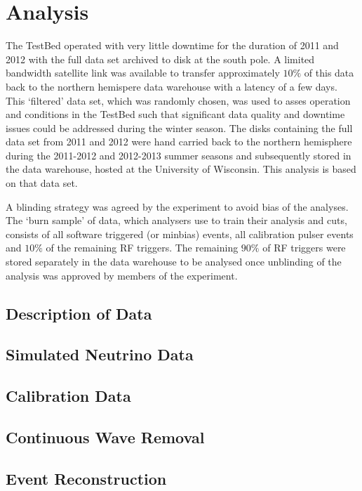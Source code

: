 \chapter{Analysis}
\label{chap:Analysis}


The TestBed operated with very little downtime for the duration of 2011 and 2012 with the full data set archived to disk at the south pole. A limited bandwidth satellite link was available to transfer approximately $10 \%$ of this data back to the northern hemispere data warehouse with a latency of a few days. This `filtered' data set, which was randomly chosen, was used to asses operation and conditions in the TestBed such that significant data quality and downtime issues could be addressed during the winter season. The disks containing the full data set from 2011 and 2012 were hand carried back to the northern hemisphere during the 2011-2012 and 2012-2013 summer seasons and subsequently stored in the data warehouse, hosted at the University of Wisconsin. This analysis is based on that data set.

A blinding strategy was agreed by the experiment to avoid bias of the analyses. The `burn sample' of data, which analysers use to train their analysis and cuts, consists of all software triggered (or minbias) events, all calibration pulser events and $10 \%$ of the remaining RF triggers. The remaining $90 \%$ of RF triggers were stored separately in the data warehouse to be analysed once unblinding of the analysis was approved by members of the experiment. 

\section{Description of Data}
\label{sec:Analysis:Data}







\section{Simulated Neutrino Data}
\label{sec:Analysis:MC-Data}



\section{Calibration Data}
\label{sec:Analysis:Calibration-Data}


\section{Continuous Wave Removal}
\label{sec:Analysis:CWRemoval}




\section{Event Reconstruction}
\label{sec:Analysis:Reconstruction}










